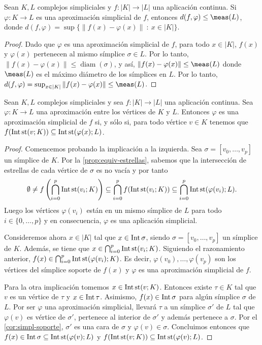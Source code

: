 \begin{proposicion}
	\label{prop:dist-approx-simp}
	Sean \( K, L \) complejos simpliciales y \( f: |K| \to |L| \) una aplicación continua. Si \( \varphi: K \to L \) es una aproximación simplicial de \( f \), entonces \( d(f,\varphi) \leq \meas(L) \), donde \( d(f,\varphi) = \sup\{\|f(x) - \varphi(x)\|\ : \ x \in |K|\} \).
\end{proposicion}
\begin{proof}
	Dado que \( \varphi \) es una aproximación simplicial de \( f \), para todo \( x \in |K| \), \( f(x) \) y \( \varphi(x) \) pertenecen al mismo símplice \( \sigma \in L \). Por lo tanto, \( \|f(x) - \varphi(x)\| \leq \operatorname{diam}(\sigma) \), y así, \( \|f(x) - \varphi(x)\| \leq \meas(L) \) donde \( \meas(L) \) es el máximo diámetro de los símplices en \( L \). Por lo tanto, \( d(f,\varphi) = \sup_{x \in |K|} \|f(x) - \varphi(x)\| \leq \meas(L) \).
\end{proof}
\begin{proposicion}
	\label{prop:char-approx-simp}
	Sean $K, L$ complejos simpliciales y sea $f: |K| \to |L|$ una aplicación continua. Sea  $\varphi: K \to L$ una aproximación entre los vértices de $K$ y $L$. Entonces $\varphi$ es una aproximación simplicial de $f$ si, y sólo si, para todo vértice $v \in K$ tenemos que $f( \operatorname{Int}\operatorname{st}(v;K)) \subseteq \operatorname{Int} \operatorname{st}(\varphi(x);L)$.
\end{proposicion}
\begin{proof}
	Comencemos probando la implicación a la izquierda. Sea $\sigma = [v_0, \dots, v_p]$ un símplice de $K$. Por la \autoref{prop:equiv-estrellas}, sabemos que la intersección de estrellas de cada vértice de $\sigma$ es no vacía y por tanto
	\[
		\emptyset \neq f \left( \bigcap_{i=0}^p\operatorname{Int} \operatorname{st} (v_i;K) \right) \subseteq \bigcap_{i=0}^p f(\operatorname{Int} \operatorname{st} (v_i;K)) \subseteq \bigcap_{i=0}^p \operatorname{Int} \operatorname{st} (\varphi(v_i);L).
	\]
	Luego los vértices $\varphi(v_i)$ están en un mismo símplice de $L$ para todo $i \in \{0,\dots,p\}$ y en consecuencia, $\varphi$ es una aplicación simplicial.
	
	Consideremos ahora $x \in |K|$ tal que $x \in \operatorname{Int} \sigma$, siendo $\sigma = [v_0, \dots, v_p]$ un símplice de $K$. Además, se tiene que $x \in \bigcap_{i=0}^p\operatorname{Int} \operatorname{st} (v_i;K)$. Siguiendo el razonamiento anterior, $f(x) \in \bigcap_{i=0}^p\operatorname{Int} \operatorname{st} (\varphi(v_i);K)$. Es decir, $\varphi(v_0), \dots, \varphi(v_p)$ son los vértices del símplice soporte de $f(x)$ y $\varphi$ es una aproximación simplicial de $f$.
	
	Para la otra implicación tomemos $x \in \operatorname{Int} \operatorname{st} (v;K)$. Entonces existe $\tau \in K$ tal que $v$ es un vértice de $\tau$ y $x \in \operatorname{Int} \tau$. Asimismo, $f(x) \in \operatorname{Int} \sigma$ para algún símplice $\sigma$ de $L$. Por ser $\varphi$ una aproximación simplicial, llevará $\tau$ a un símplice $\sigma'$ de $L$ tal que $\varphi(v)$ es vértice de $\sigma'$, pertenece al interior de $\sigma'$ y además pertenece a $\sigma$. Por el \autoref{cor:simpl-soporte}, $\sigma'$ es una cara de $\sigma$ y $\varphi(v) \in \sigma$. Concluimos entonces que $f(x) \in \operatorname{Int} \sigma \subseteq \operatorname{Int} \operatorname{st}(\varphi(v);L)$ y $f(\operatorname{Int} \operatorname{st}(v;K)) \subseteq \operatorname{Int} \operatorname{st}(\varphi(v);L)$.
\end{proof}
